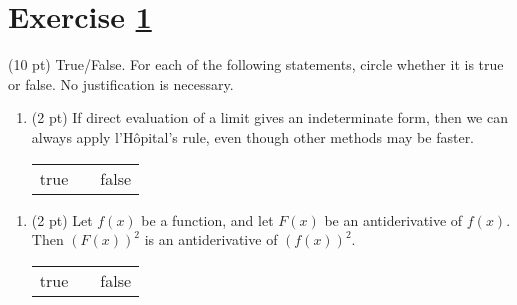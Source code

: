 %
%
%
%


\section{Exercise \ref{sec : Math112 Spring2022 MockExam2 Q1}}
\label{sec : Math112 Spring2022 MockExam2 Q1}

(10 pt) True/False. For each of the following statements, circle whether it is true or false. No justification is necessary.

\begin{enumerate}[label=(\alph*)]
\item\label{itm : ME2Q1a} (2 pt) If direct evaluation of a limit gives an indeterminate form, then we can always apply l'H\^{o}pital's rule, even though other methods may be faster.
\begin{center}
\begin{tabular}{c c c}
true	&	\hspace{1in}	&	false
\end{tabular}
\end{center}
\end{enumerate}




\begin{enumerate}[resume,label=(\alph*)]
\item\label{itm : ME2Q1b} (2 pt) Let $f(x)$ be a function, and let $F(x)$ be an antiderivative of $f(x)$. Then $(F(x))^{2}$ is an antiderivative of $(f(x))^{2}$.
\begin{center}
\begin{tabular}{c c c}
true	&	\hspace{1in}	&	false
\end{tabular}
\end{center}
\end{enumerate}




